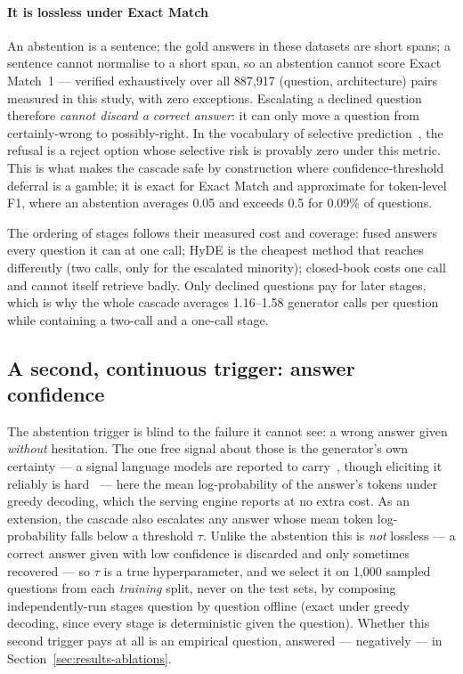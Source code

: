 \paragraph{It is lossless under Exact Match} An abstention is a sentence;
the gold answers in these datasets are short spans; a sentence cannot
normalise to a short span, so an abstention cannot score Exact Match~1 ---
verified exhaustively over all 887{,}917 (question, architecture) pairs
measured in this study, with zero exceptions. Escalating a declined
question therefore \emph{cannot discard a correct answer}: it can only
move a question from certainly-wrong to possibly-right. In the vocabulary
of selective prediction~\citep{chow1970reject,geifman2017selective}, the
refusal is a reject option whose selective risk is provably zero under
this metric. This is what makes the cascade safe by construction where
confidence-threshold deferral is a gamble; it is exact for Exact Match and approximate for token-level F1,
where an abstention averages 0.05 and exceeds 0.5 for 0.09\% of questions.

The ordering of stages follows their measured cost and coverage: fused
answers every question it can at one call; HyDE is the cheapest method
that reaches differently (two calls, only for the escalated minority);
closed-book costs one call and cannot itself retrieve badly. Only declined
questions pay for later stages, which is why the whole cascade averages
1.16--1.58 generator calls per question while containing a two-call and a
one-call stage.

\subsection{A second, continuous trigger: answer confidence}
\label{sec:cascade-confidence}

The abstention trigger is blind to the failure it cannot see: a wrong
answer given \emph{without} hesitation. The one free signal about those is
the generator's own certainty --- a signal language models are reported
to carry~\citep{kadavath2022know}, though eliciting it reliably is
hard~\citep{xiong2024uncertainty} --- here the mean log-probability of the
answer's tokens under greedy decoding, which the serving engine reports
at no extra cost. As an extension, the cascade also escalates any answer whose mean
token log-probability falls below a threshold $\tau$. Unlike the
abstention this is \emph{not} lossless --- a correct answer given with low
confidence is discarded and only sometimes recovered --- so $\tau$ is a
true hyperparameter, and we select it on 1{,}000 sampled questions from
each \emph{training} split, never on the test sets, by composing
independently-run stages question by question offline (exact under greedy
decoding, since every stage is deterministic given the question). Whether
this second trigger pays at all is an empirical question, answered ---
negatively --- in Section~\ref{sec:results-ablations}.

